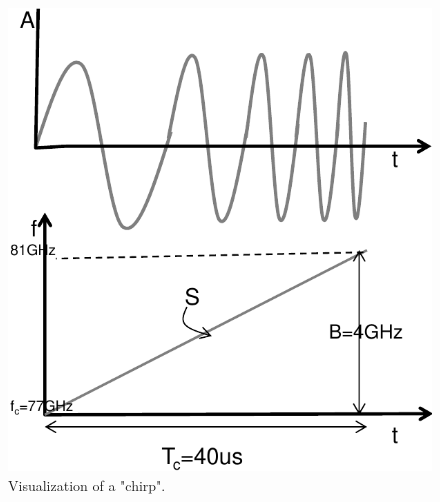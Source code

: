 \begin{figure}[h]
    \begin{minipage}[c]{0.4\textwidth}
    \includegraphics[width=\linewidth]{figures/mmwave/mmwave_chirp.png}
        \caption{Visualization of a "chirp". \cite{introduction_to_mmwave}}
        \label{fig:mmwave_chirp}
    \end{minipage}
    \hfill
    \begin{minipage}[c]{0.4\textwidth}

\end{minipage}
\end{figure}
